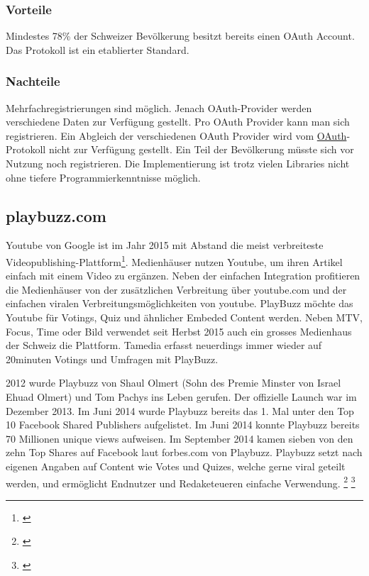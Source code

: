 \newpage

\subsubsection{Vorteile}\label{vorteile}

Mindestes 78\% der Schweizer Bevölkerung besitzt bereits einen OAuth
Account. Das Protokoll ist ein etablierter Standard.

\subsubsection{Nachteile}\label{nachteile}

Mehrfachregistrierungen sind möglich. Jenach OAuth-Provider werden
verschiedene Daten zur Verfügung gestellt. Pro OAuth Provider kann man
sich registrieren. Ein Abgleich der verschiedenen OAuth Provider wird
vom \protect\hyperlink{oauth-1}{OAuth}-Protokoll nicht zur Verfügung
gestellt. Ein Teil der Bevölkerung müsste sich vor Nutzung noch
registrieren. Die Implementierung ist trotz vielen Libraries nicht ohne
tiefere Programmierkenntnisse möglich.

\newpage

\subsection{playbuzz.com}\label{playbuzz.com}

Youtube von Google ist im Jahr 2015 mit Abstand die meist verbreiteste
Videopublishing-Plattform\footnote{\autocite{statista}}. Medienhäuser
nutzen Youtube, um ihren Artikel einfach mit einem Video zu ergänzen.
Neben der einfachen Integration profitieren die Medienhäuser von der
zusätzlichen Verbreitung über youtube.com und der einfachen viralen
Verbreitungsmöglichkeiten von youtube. PlayBuzz möchte das Youtube für
Votings, Quiz und ähnlicher Embeded Content werden. Neben MTV, Focus,
Time oder Bild verwendet seit Herbst 2015 auch ein grosses Medienhaus
der Schweiz die Plattform. Tamedia erfasst neuerdings immer wieder auf
20minuten Votings und Umfragen mit PlayBuzz.

2012 wurde Playbuzz von Shaul Olmert (Sohn des Premie Minster von Israel
Ehuad Olmert) und Tom Pachys ins Leben gerufen. Der offizielle Launch
war im Dezember 2013. Im Juni 2014 wurde Playbuzz bereits das 1. Mal
unter den Top 10 Facebook Shared Publishers aufgelistet. Im Juni 2014
konnte Playbuzz bereits 70 Millionen unique views aufweisen. Im
September 2014 kamen sieben von den zehn Top Shares auf Facebook laut
forbes.com von Playbuzz. Playbuzz setzt nach eigenen Angaben auf Content
wie Votes und Quizes, welche gerne viral geteilt werden, und ermöglicht
Endnutzer und Redaketeueren einfache Verwendung. \footnote{\autocite{t3nplaybuzz}}
\footnote{\autocite{playbuzz}}

